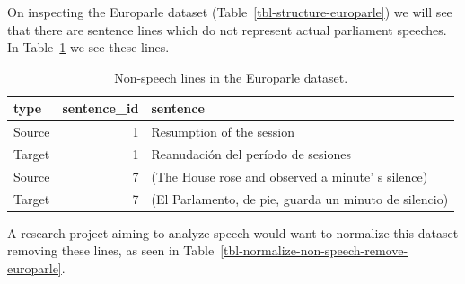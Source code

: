 \documentclass[
  letterpaper,
]{latex/krantz}
\begin{document}
On inspecting the Europarle dataset
(Table~\ref{tbl-structure-europarle}) we will see that there are
sentence lines which do not represent actual parliament speeches. In
Table~\ref{tbl-normalize-non-speech-identify-europarle} we see these
lines.

\hypertarget{tbl-normalize-non-speech-identify-europarle}{}
\begin{table}
\caption{\label{tbl-normalize-non-speech-identify-europarle}Non-speech lines in the Europarle dataset. }\tabularnewline

\centering
\begin{tabular}{lrl}
\toprule
type & sentence\_id & sentence\\
\midrule
Source & 1 & Resumption of the session\\
Target & 1 & Reanudación del período de sesiones\\
Source & 7 & (The House rose and observed a minute' s silence)\\
Target & 7 & (El Parlamento, de pie, guarda un minuto de silencio)\\
\bottomrule
\end{tabular}
\end{table}

A research project aiming to analyze speech would want to normalize this
dataset removing these lines, as seen in
Table~\ref{tbl-normalize-non-speech-remove-europarle}.
\end{document}
